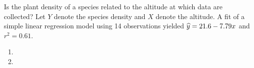 Is the plant density of a species related to the altitude at which data are collected? Let $Y$ denote the species density and $X$ denote the altitude. A fit of a simple linear regression model using 14 observations yielded $\widehat{y} = 21.6 - 7.79x$ and $r^2 = 0.61$.
\begin{enumerate}
\item 
\item 
\end{enumerate}

